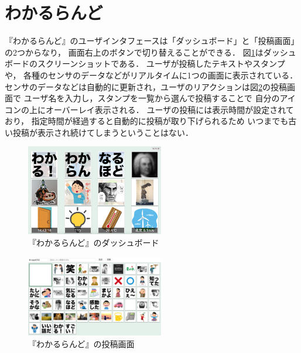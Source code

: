 \section{わかるらんど}
『わかるらんど』のユーザインタフェースは「ダッシュボード」と「投稿画面」の2つからなり，
画面右上のボタンで切り替えることができる．
図\ref{dashboard}はダッシュボードのスクリーンショットである．
ユーザが投稿したテキストやスタンプや，
各種のセンサのデータなどがリアルタイムに1つの画面に表示されている．
センサのデータなどは自動的に更新され，ユーザのリアクションは図\ref{console}の投稿画面で
ユーザ名を入力し，スタンプを一覧から選んで投稿することで
自分のアイコンの上にオーバーレイ表示される．
ユーザの投稿には表示時間が設定されており，
指定時間が経過すると自動的に投稿が取り下げられるため
いつまでも古い投稿が表示され続けてしまうということはない．

\begin{figure}[h]
\centering
\includegraphics[width=6cm]{images/dashboard.png}
\caption{『わかるらんど』のダッシュボード}
\label{dashboard}
\end{figure}

\begin{figure}[h]
\centering
\includegraphics[width=6cm]{images/console.png}
\caption{『わかるらんど』の投稿画面}
\label{console}
\end{figure}